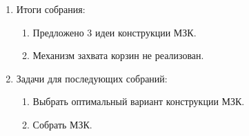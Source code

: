 \begin{enumerate}
\begin{enumerate}
	\end{enumerate}
	
	\item Итоги собрания: 
	\begin{enumerate}
		\item Предложено 3 идеи конструкции МЗК.
		
		\item Механизм захвата корзин не реализован.
		
	\end{enumerate}
	
	\item Задачи для последующих собраний:
	\begin{enumerate}
		\item Выбрать оптимальный вариант конструкции МЗК.
		
		\item Собрать МЗК.
		
	\end{enumerate}     
\end{enumerate}
\fillpage

